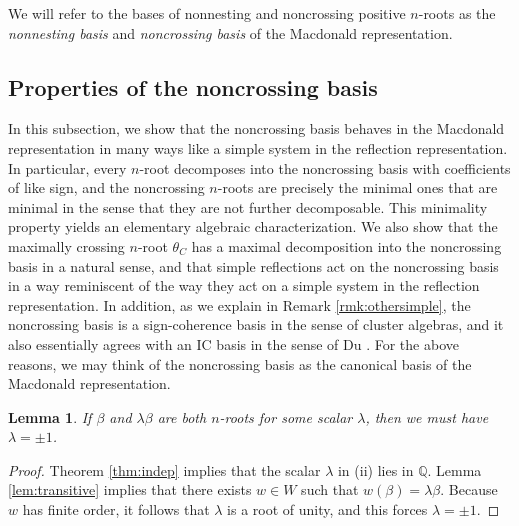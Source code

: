 \documentclass[11pt]{amsart}
\theoremstyle{plain}
\newtheorem{lemma}[theorem]{Lemma}
\theoremstyle{definition}
\theoremstyle{remark}
\numberwithin{equation}{subsection}
\newcommand{\be}{\beta}
\newcommand{\Q}{{\mathbb Q}}
\begin{document}
We will refer to the bases of nonnesting and noncrossing positive $n$-roots as
the \emph{nonnesting basis} and \emph{noncrossing basis} of the Macdonald
representation.



\subsection{Properties of the noncrossing basis}
\label{sec:ncbasis}
In this subsection, we show that the noncrossing basis  behaves in the Macdonald
representation in many ways like a simple system in the reflection
representation. In particular, every $n$-root decomposes into the noncrossing
basis with coefficients of like sign, and the noncrossing $n$-roots are
precisely the minimal ones that are minimal in the sense that they are not
further decomposable.
This minimality property yields an elementary algebraic characterization.  We
also show that the maximally crossing $n$-root $\theta_C$ has a maximal
decomposition into the noncrossing basis in a natural sense, and that simple
reflections act on the noncrossing basis in a way reminiscent of the way they
act on a simple system in the reflection representation. In addition, as we
explain in Remark \ref{rmk:othersimple}, 
the noncrossing basis is a sign-coherence basis in the sense of cluster
algebras, and it also essentially agrees with an IC basis in the sense of Du
\cite{Du}.
For the above reasons, we
may think of the noncrossing basis as the canonical basis of the Macdonald
representation.

\begin{lemma}
    \label{lem:pm1}
{If $\be$ and $\lambda \be$ are both $n$-roots for some scalar $\lambda$, then we must have $\lambda = \pm 1$.}
\end{lemma}


\begin{proof}
Theorem \ref{thm:indep} implies that the scalar $\lambda$ in (ii) lies in $\Q$.
Lemma \ref{lem:transitive} implies that there exists $w \in W$ such that $w(\be)
= \lambda \be$. Because $w$ has finite order, it follows that $\lambda$ is a
root of unity, and this forces $\lambda=\pm 1$.
\end{proof}
\end{document}
